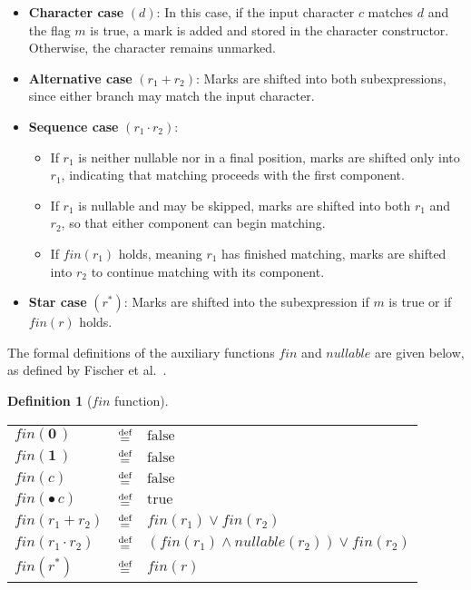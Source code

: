 \documentclass[12pt]{article}
\newtheorem{definition}{Definition} %
\newcommand{\dn}{\ensuremath{\stackrel{\mbox{\scriptsize def}}{=}}}
\newcommand{\ZERO}{\textbf{0}}
\newcommand{\ONE}{\textbf{1}}
\newcommand{\Marked}[1]{\bullet\,#1}
\newcommand{\fin}{\textit{fin}}
\newcommand{\nullable}{\textit{nullable}}
\begin{document}
\begin{itemize}
  \item \textbf{Character case} $(d)$:  
  In this case, if the input character $c$ matches $d$ and the flag $m$ is true, a mark 
  is added and stored in the character constructor. Otherwise, the character remains unmarked.  

  \item \textbf{Alternative case} $(r_1 + r_2)$:  
  Marks are shifted into both subexpressions, since either branch may match the input character.  

  \item \textbf{Sequence case} $(r_1 \cdot r_2)$:  
  \begin{itemize}
    \item If $r_1$ is neither nullable nor in a final position, marks are shifted only into $r_1$,  
          indicating that matching proceeds with the first component. 

    \item If $r_1$ is nullable and may be skipped, marks are shifted into both $r_1$ and $r_2$,  
          so that either component can begin matching. 

    \item If $\fin(r_1)$ holds, meaning $r_1$ has finished matching, marks are shifted into $r_2$  
          to continue matching with its component.  
  \end{itemize}

  \item \textbf{Star case} $(r^*)$:  
  Marks are shifted into the subexpression if $m$ is true or if $\fin(r)$ holds.  
\end{itemize}
The formal definitions of the auxiliary functions $\fin$ and $\nullable$ are given below, 
as defined by Fischer et al.~\cite{Fischer2010}.
\begin{definition}[$\fin$ function]\mbox{}

  \renewcommand{\arraystretch}{1.5}
  \begin{tabular}{lcl}
    $\fin(\ZERO\,)$            & \dn & $\text{false}$ \\
    $\fin(\ONE\,)$             & \dn & $\text{false}$ \\
    $\fin(c)$                  & \dn & $\text{false}$ \\
    $\fin(\Marked{c})$         & \dn & $\text{true}$ \\
    $\fin(r_1 + r_2)$          & \dn & $\fin(r_1) \lor \fin(r_2)$ \\ 
    $\fin(r_1 \cdot r_2)$      & \dn & $(\fin(r_1) \land \nullable(r_2)) \lor \fin(r_2)$ \\
    $\fin(r^*)$                & \dn & $\fin(r)$  
  \end{tabular}
  \renewcommand{\arraystretch}{1.0}

\end{definition}
\end{document}
